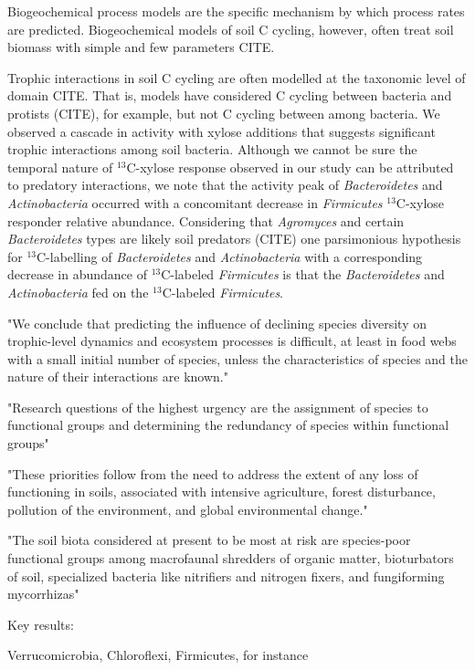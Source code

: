 Biogeochemical process models are the specific mechanism by which process rates
are predicted. Biogeochemical models of soil C cycling, however, often treat
soil biomass with simple and few parameters CITE.  

Trophic interactions in soil C cycling are often modelled at the taxonomic
level of domain CITE. That is, models have considered C cycling between
bacteria and protists (CITE), for example, but not C cycling between among
bacteria. We observed a cascade in activity with xylose additions that
suggests significant trophic interactions among soil bacteria. Although we
cannot be sure the temporal nature of $^{13}$C-xylose response observed in our
study can be attributed to predatory interactions, we note that the activity
peak of \textit{Bacteroidetes} and \textit{Actinobacteria} occurred with
a concomitant decrease in \textit{Firmicutes} $^{13}$C-xylose responder
relative abundance. Considering that \textit{Agromyces} and certain
\textit{Bacteroidetes} types are likely soil predators (CITE) one parsimonious
hypothesis for $^{13}$C-labelling of \textit{Bacteroidetes} and
\textit{Actinobacteria} with a corresponding decrease in abundance of
$^{13}$C-labeled \textit{Firmicutes} is that the \textit{Bacteroidetes} and
\textit{Actinobacteria} fed on the $^{13}$C-labeled \textit{Firmicutes}. 

"We conclude that predicting the influence of declining species diversity on
trophic-level dynamics and ecosystem processes is difficult, at least in food
webs with a small initial number of species, unless the characteristics of
species and the nature of their interactions are known."

"Research questions of the highest urgency are the assignment of species
to functional groups and determining the redundancy of species within
functional groups"

"These priorities follow from the need to address the extent of any loss
of functioning in soils, associated with intensive agriculture, forest
disturbance, pollution of the environment, and global environmental
change."

"The soil biota considered at present to be most at risk are species-poor
functional groups among macrofaunal shredders of organic matter,
bioturbators of soil, specialized bacteria like nitrifiers and nitrogen
fixers, and fungiforming mycorrhizas" 

Key results:

Verrucomicrobia, Chloroflexi, Firmicutes, for instance

